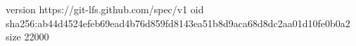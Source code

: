 version https://git-lfs.github.com/spec/v1
oid sha256:ab44d4524efeb69ead4b76d859fd8143ea51b8d9aca68d8dc2aa01d10fe0b0a2
size 22000
